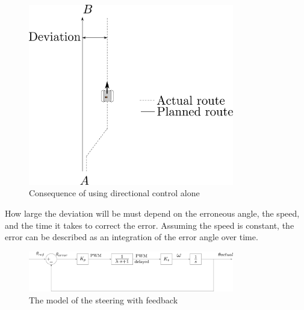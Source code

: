 \begin{figure}[H]
	\centering
	\includegraphics[width=0.8\textwidth]{figures/steeringDeviation.pdf}
	\caption{Consequence of using directional control alone}
	\label{SteeringDeviation}
\end{figure}

How large the deviation will be must depend on the erroneous angle, the speed, and the time it takes to correct the error. Assuming the speed is constant, the error can be described as an integration of the error angle over time.


\begin{figure}[H]
	\centering
	\includegraphics[width=0.8\textwidth]{figures/basicSteeringModelWithDelayWithFeedback.pdf}
	\caption{The model of the steering with feedback}
	\label{basicSteeringWithDelayWithFeedback}
\end{figure}






